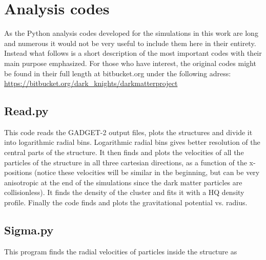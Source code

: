 \section{Analysis codes}
As the Python analysis codes developed for the simulations in this work are long and numerous it would not be very useful to include them here in their entirety. Instead what follows is a short description of the most important codes with their main purpose emphasized. For those who have interest, the original codes might be found in their full length at bitbucket.org under the following adress: \\
\url{https://bitbucket.org/dark_knights/darkmatterproject}

\subsection{Read.py}
This code reads the GADGET-2 output files, plots the structures and divide it into logarithmic radial bins. Logarithmic radial bins gives better resolution of the central parts of the structure. It then finds and plots the velocities of all the particles of the structure in all three cartesian directions, as a function of the x-positions (notice these velocities will be similar in the beginning, but can be very anisotropic at the end of the simulations since the dark matter particles are collisionless). It finds the density of the cluster and fits it with a HQ density profile. Finally the code finds and plots the gravitational potential vs. radius.

%

\subsection{Sigma.py}
This program finds the radial velocities of particles inside the structure as


